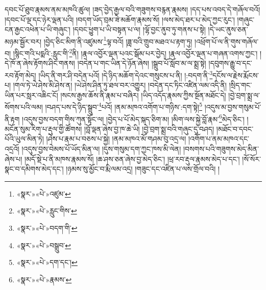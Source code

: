 དབང་པོ་ཐུབ་རྣམས་ནམ་མཁའི་ཚུལ། །ཟད་བྱེད་རྒྱལ་བའི་གཟུགས་བརྙན་རྣམས། །དད་པས་འབད་དེ་གཞོལ་བའོ། །དབང་པོ་ལྔ་དང་ཉེར་ལྡན་པའི། །བདག་ཡོད་བྲམ་ཟེ་མཆོག་རྣམས་སོ། །ལས་མེད་ཐར་པ་མེད་ཀྱང་རུང་། །གཞུང་ངན་རྒྱང་འཕེན་པ་ཡི་གཞུང་། །དབང་ཕྱུག་པ་ཡི་བསྟན་པ་ལ། །ལྷོ་བྱང་ནུབ་ཏུ་གནས་པ་སྟེ། །དེ་ཡང་ནུས་ཅན་མཉམ་སྦྱོར་བར། །བྱེད་ཅིང་མིག་ནི་འཛུམས་\footnote{«སྣར་»«པེ་»འཛུམ་}ལྟ་བའོ། །ཟླ་བའི་གྲུབ་མཐའ་པ་རྟག་ཏུ། །འཕྲོག་པོ་ལ་ནི་གུས་གཞོལ་བ། །སྙིང་གའི་པདྨའི་:རླུང་གི་\footnote{«སྣར་»«པེ་»རླུང་གིས་}ནི། །རྣལ་འབྱོར་ལྡན་པའང་སྒོམ་པར་བྱེད། །རྣལ་འབྱོར་ལྡན་པ་གཞན་འགས་ཀྱང་། །དེ་ཁོ་ན་ཞེས་རྟོགས་ཤིང་གནས། །བདེན་པ་གང་ཡིན་དེ་ཉོན་ཞེས། །སྒྲུབ་པོ་སློབ་མ་ལ་སྨྲ་སྟེ། །དབུགས་རྒྱུ་བ་དང་རབ་རྟོག་མེད། །ཡིད་ནི་གར་ཤི་བདེན་པའོ། །དེ་ཉིད་མཆོག་དེའང་གསུངས་པ་ནི། །:བདག་ནི་\footnote{«སྣར་»«པེ་»བདག་གི་}དངོས་ལ་རྗེས་རྨོངས་པ། །གལ་ཏེ་ཡེ་ཤེས་མི་ཤེས་ན། །ཡེ་ཤེས་ཤིན་ཏུ་ཐལ་བར་འགྱུར། །བདེན་དང་ཏིང་འཛིན་ལམ་འདི་ནི། །སྲིད་གང་ཡིན་པར་སླར་འཆིང་ངོ། །སངས་རྒྱས་ཆོས་ནི་རྣམ་པ་བཞིར། །ཡིད་འདོད་རྣམས་ཀྱིས་སྔོན་མཐོང་དེ། །བྱེ་བྲག་སྨྲ་ལ་སོགས་པའི་ལམ། །བཤད་པས་དེ་ཉིད་སྒྲུབ་\footnote{«སྣར་»«པེ་»བསྒྲུབ་}པའོ། །ནམ་མཁའ་འགོག་པ་གཉིས་:དག་སྟེ།\footnote{«སྣར་»«པེ་»དག་དང་།} །འདུས་མ་བྱས་གསུམ་པོ་ནི་རྟག །འདུས་བྱས་བདག་གིས་ཀུན་སྟོང་ལ། །བྱེད་པ་པོ་མེད་སྐད་ཅིག་མ། །མིག་ལས་སྐྱེ་བློ་རྣམ་\footnote{«སྣར་»«པེ་»རྣམས་}མེད་ཅིང་། །མངོན་སུམ་རིག་པ་རྡུལ་གྱི་ཚོགས། །བློ་ལྡན་ཞེས་བྱ་ཁ་ཆེ་ཡི། །བྱེ་བྲག་སྨྲ་བའི་གཞུང་དུ་བཤད། །མཐོང་བ་དབང་པོའི་ཡུལ་མིན་ཏེ། །ཤེས་པ་རྣམ་པ་བཅས་པ་སྐྱེ། །ནམ་མཁའ་མོ་གཤམ་བུ་འདྲ་ལ། །འགོག་པ་ནམ་མཁའ་དང་འདྲའོ། །འདུས་བྱས་བེམས་པོ་ཡོད་མིན་ལ། །དུས་གསུམ་དག་ཀྱང་ཁས་མི་ལེན། །བསགས་པའི་གཟུགས་མེད་མིན་ཞེས་པ། །མདོ་སྡེ་པ་ནི་མཁས་རྣམས་སོ། །ཆ་ཤས་ཅན་ཞེས་བྱ་མེད་ཅིང་། །ཕྲ་རབ་རྡུལ་རྣམས་མེད་པ་དང་། །སོ་སོར་སྣང་བ་དམིགས་མེད་དང་། །ཉམས་སུ་མྱོང་བ་རྨི་ལམ་འདྲ། །གཟུང་དང་འཛིན་པ་ལས་གྲོལ་བའི། །
